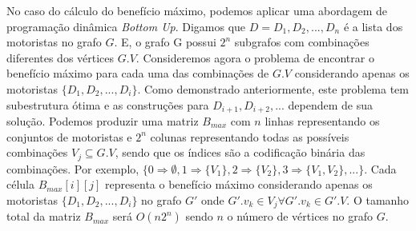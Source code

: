 \documentclass{article}
\begin{document}

No caso do cálculo do benefício máximo, podemos aplicar uma abordagem de programação dinâmica \textit{Bottom Up}.
Digamos que $ D = {D_1, D_2, ..., D_n} $ é a lista dos motoristas no grafo $ G $. E, o grafo G possui $ 2^n $ 
subgrafos com combinações diferentes dos vértices $ G.V $. Consideremos agora o problema de encontrar 
o benefício máximo para cada uma das combinações de $ G.V $ considerando apenas os motoristas $ \{ D_1, D_2, ..., D_i \} $.
Como demonstrado anteriormente, este problema tem subestrutura ótima e as construções para $ D_{i+1}, D_{i+2}, ... $
dependem de sua solução. Podemos produzir uma matriz $ B_{max} $ com $ n $ linhas representando os conjuntos
de motoristas e $ 2^n $ colunas representando todas as possíveis combinações $ V_j \subseteq G.V $, sendo que os índices 
são a codificação binária das combinações. Por exemplo, $ \{ 0 \Rightarrow \emptyset, 1 \Rightarrow \{ V_1\},
2 \Rightarrow \{ V_2\}, 3 \Rightarrow \{ V_1, V_2\}, ... \} $. Cada célula $ B_{max}[i][j] $ representa o benefício máximo
considerando apenas os motoristas $ \{ D_1, D_2, ..., D_i \} $ no grafo $ G' $ onde $ G'.v_k \in V_j \forall G'.v_k \in G'.V $.
O tamanho total da matriz $ B_{max} $ será $ O(n2^n) $ sendo $ n $ o número de vértices no grafo $ G $.
\end{document}
